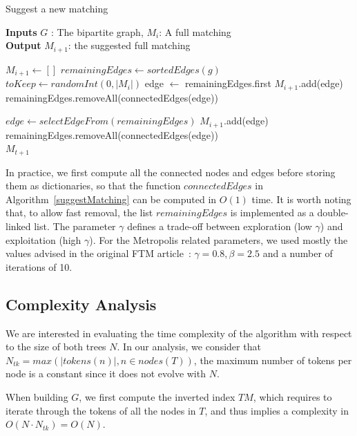 \begin{algorithm}
\caption{Suggest a new matching}
\hspace*{\algorithmicindent} \textbf{Inputs}
$G$ : The bipartite graph, 
$M_i$: A full matching \\
\hspace*{\algorithmicindent} \textbf{Output} 
$M_{i+1}$: the suggested full matching
\begin{algorithmic}
 \State $M_{i+1} \gets [ ]$ 
 \State $remainingEdges \gets sortedEdges(g)$
 \State $toKeep \gets randomInt(0, |M_i|)$
    \State edge $\gets$ remainingEdges.first
 	\State $M_{i+1}$.add(edge)
    \State remainingEdges.removeAll(connectedEdges(edge))
 \EndFor
 
    $edge \gets selectEdgeFrom(remainingEdges)$
    $M_{i+1}$.add(edge)
    remainingEdges.removeAll(connectedEdges(edge))
 \EndWhile \\
 \Return $M_{t+1}$
\end{algorithmic}
\label{suggestMatching}
\end{algorithm}

In practice, we first compute all the connected nodes and edges before storing them as dictionaries, so that the function $connectedEdges$ in Algorithm~\ref{suggestMatching} can be computed in $O(1)$ time.
It is worth noting that, to allow fast removal, the list $remainingEdges$ is implemented as a double-linked list.
The parameter $\gamma$ defines a trade-off between exploration (low $\gamma$) and exploitation (high $\gamma$).
For the Metropolis related parameters, we used mostly the values advised in the original FTM article~\cite{Kumar2011_FTM}: $\gamma = 0.8, \beta = 2.5$ and a number of iterations of 10.

\subsection{Complexity Analysis}\label{sftm:sec:complexity}
We are interested in evaluating the time complexity of the algorithm with respect to the size of both trees $N$.
In our analysis, we consider that $N_{tk}=max(|tokens(n)|, n \in nodes(T))$, the maximum number of tokens per node is a constant since it does not evolve with $N$.

When building $G$, we first compute the inverted index $TM$, which requires to iterate through the tokens of all the nodes in $T$, and thus implies a complexity in $O(N \cdot N_{tk}) = O(N)$.

